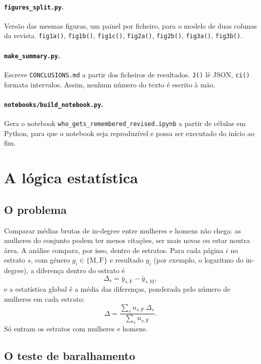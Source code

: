\documentclass[11pt,a4paper]{article}
\newcommand{\file}[1]{\texttt{#1}}
\newcommand{\fn}[1]{\texttt{#1()}}
\begin{document}
\paragraph{\file{figures_split.py}.} Versão das mesmas figuras, um painel por ficheiro, para o modelo de duas colunas da revista. \fn{fig1a}, \fn{fig1b}, \fn{fig1c}, \fn{fig2a}, \fn{fig2b}, \fn{fig3a}, \fn{fig3b}.

\paragraph{\file{make_summary.py}.} Escreve \file{CONCLUSIONS.md} a partir dos ficheiros de resultados. \fn{J} lê JSON, \fn{ci} formata intervalos. Assim, nenhum número do texto é escrito à mão.

\paragraph{\file{notebooks/build_notebook.py}.} Gera o notebook \file{who_gets_remembered_revised.ipynb} a partir de células em Python, para que o notebook seja reproduzível e possa ser executado do início ao fim.

\section{A lógica estatística}
\label{sec:logica}

\subsection{O problema}

Comparar médias brutas de in-degree entre mulheres e homens não chega: as mulheres do conjunto podem ter menos citações, ser mais novas ou estar noutra área. A análise compara, por isso, dentro de estratos. Para cada página $i$ no estrato $s$, com género $g_i \in \{\text{M}, \text{F}\}$ e resultado $y_i$ (por exemplo, o logaritmo do in-degree), a diferença dentro do estrato é
\[
  \Delta_s = \bar{y}_{s,\text{F}} - \bar{y}_{s,\text{M}},
\]
e a estatística global é a média das diferenças, ponderada pelo número de mulheres em cada estrato:
\[
  \Delta = \frac{\sum_s n_{s,\text{F}}\,\Delta_s}{\sum_s n_{s,\text{F}}}.
\]
Só entram os estratos com mulheres e homens.

\subsection{O teste de baralhamento}
\end{document}
